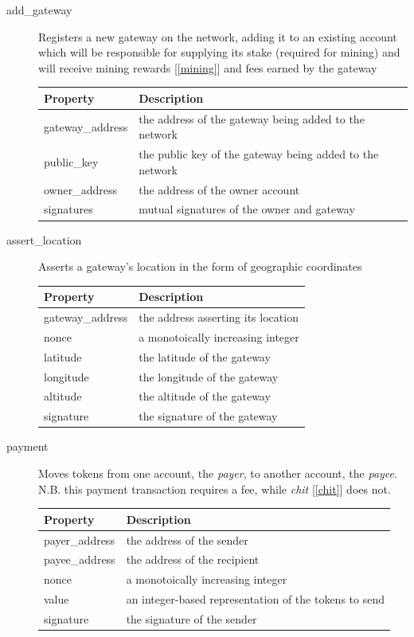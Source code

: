 \documentclass[letterpaper,11pt]{article}
\begin{document}
\begin{description}
  \item [add\_gateway] Registers a new gateway on the network, adding it to an existing account which will be responsible for supplying its stake (required for mining) and will receive mining rewards [\ref{mining}] and fees earned by the gateway

\begin{table}[H]
  \centering
  \begin{tabularx}{\textwidth}{l X}
    \toprule
    Property & Description \\ \midrule
    gateway\_address & the address of the gateway being added to the network \\
    public\_key & the public key of the gateway being added to the network \\
    owner\_address & the address of the owner account \\
    signatures & mutual signatures of the owner and gateway
  \end{tabularx}
\end{table}

\item [assert\_location] Asserts a gateway's location in the form of geographic coordinates

\begin{table}[H]
  \centering
  \begin{tabularx}{\textwidth}{l X}
      \toprule
      Property & Description \\ \midrule
      gateway\_address & the address asserting its location \\
      nonce & a monotoically increasing integer \\
      latitude & the latitude of the gateway \\
      longitude & the longitude of the gateway \\
      altitude & the altitude of the gateway \\
      signature & the signature of the gateway
  \end{tabularx}
\end{table}

\item [payment] \label{payment} Moves tokens from one account, the \emph{payer}, to another account, the \emph{payee}. N.B. this payment transaction requires a fee, while \emph{chit} [\ref{chit}] does not.

\begin{table}[H]
  \centering
  \begin{tabularx}{\textwidth}{l X}
      \toprule
      Property & Description \\ \midrule
      payer\_address & the address of the sender \\
      payee\_address & the address of the recipient \\
      nonce & a monotoically increasing integer \\
      value & an integer-based representation of the tokens to send \\
      signature & the signature of the sender
  \end{tabularx}
\end{table}


\end{description}
\end{document}
